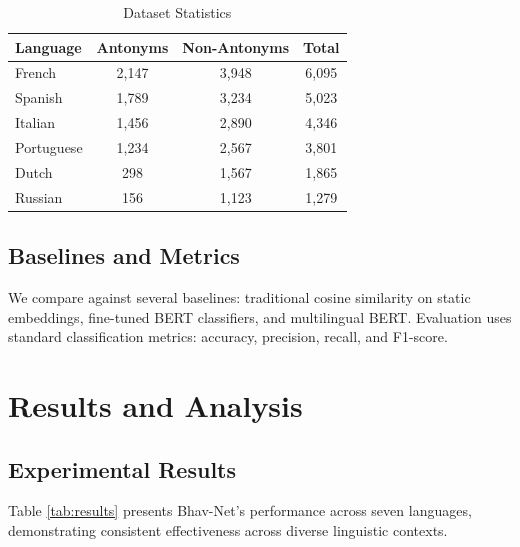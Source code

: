 \documentclass[11pt]{article}
\begin{document}
\begin{table}[htbp]
\caption{Dataset Statistics}
\begin{center}
\begin{tabular}{|l|c|c|c|}
\hline
\textbf{Language} & \textbf{Antonyms} & \textbf{Non-Antonyms} & \textbf{Total} \\
\hline
French & 2,147 & 3,948 & 6,095 \\
\hline
Spanish & 1,789 & 3,234 & 5,023 \\
\hline
Italian & 1,456 & 2,890 & 4,346 \\
\hline
Portuguese & 1,234 & 2,567 & 3,801 \\
\hline
Dutch & 298 & 1,567 & 1,865 \\
\hline
Russian & 156 & 1,123 & 1,279 \\
\hline
\end{tabular}
\label{tab:dataset_stats}
\end{center}
\end{table}

\subsection{Baselines and Metrics}
We compare against several baselines: traditional cosine similarity on static embeddings, fine-tuned BERT classifiers, and multilingual BERT. Evaluation uses standard classification metrics: accuracy, precision, recall, and F1-score.

\section{Results and Analysis}

\subsection{Experimental Results}
Table \ref{tab:results} presents Bhav-Net's performance across seven languages, demonstrating consistent effectiveness across diverse linguistic contexts.
\end{document}
